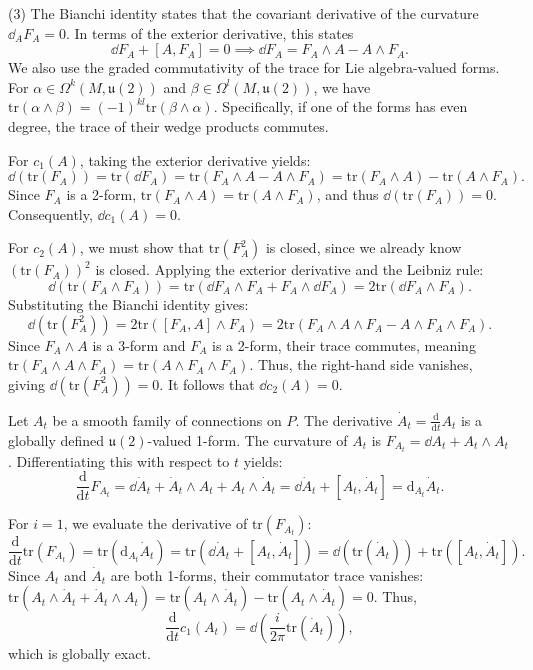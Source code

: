 \documentclass[11pt, letterpaper]{article}
\theoremstyle{plain}
\begin{document}
(3) The Bianchi identity states that the covariant derivative of the curvature $\dd _AF_A=0$. In terms of the exterior derivative, this states
\[
	\dd F_A + [A,F_A] = 0 \implies \dd F_A = F_A \wedge A - A \wedge F_A
.\]
We also use the graded commutativity of the trace for Lie algebra-valued forms. For $\alpha \in \Omega^k(M, \mathfrak{u}(2))$ and $\beta \in \Omega^l(M, \mathfrak{u}(2))$, we have $\mathrm{tr}(\alpha \wedge \beta) = (-1)^{kl} \mathrm{tr}(\beta \wedge \alpha)$. Specifically, if one of the forms has even degree, the trace of their wedge products commutes.




For $c_1(A)$, taking the exterior derivative yields:
\[
	\dd (\mathrm{tr}(F_A)) = \mathrm{tr}(\dd F_A) = \mathrm{tr}(F_A \wedge A - A \wedge F_A) = \mathrm{tr}(F_A \wedge A) - \mathrm{tr}(A \wedge F_A)
.\]
Since $F_A$ is a 2-form, $\mathrm{tr}(F_A \wedge A) = \mathrm{tr}(A \wedge F_A)$, and thus $\dd (\mathrm{tr}(F_A)) = 0$. Consequently, $\dd c_1(A) = 0$.

For $c_2(A)$, we must show that $\mathrm{tr}(F_A^2)$ is closed, since we already know $(\mathrm{tr}(F_A))^2$ is closed. Applying the exterior derivative and the Leibniz rule:
\[
	\dd (\mathrm{tr}(F_A \wedge F_A)) = \mathrm{tr}(\dd F_A \wedge F_A + F_A \wedge \dd F_A) = 2\mathrm{tr}(\dd F_A \wedge F_A)
.\]
Substituting the Bianchi identity gives:
\[
	\dd (\mathrm{tr}(F_A^2)) = 2\mathrm{tr}([F_A, A] \wedge F_A) = 2\mathrm{tr}(F_A \wedge A \wedge F_A - A \wedge F_A \wedge F_A)
.\]
Since $F_A \wedge A$ is a 3-form and $F_A$ is a 2-form, their trace commutes, meaning $\mathrm{tr}(F_A \wedge A \wedge F_A) = \mathrm{tr}(A \wedge F_A \wedge F_A)$. Thus, the right-hand side vanishes, giving $\dd (\mathrm{tr}(F_A^2)) = 0$. It follows that $\dd c_2(A) = 0$.




Let $A_t$ be a smooth family of connections on $P$. The derivative $\dot{A}_t = \frac{\mathrm{d}}{\mathrm{d}t} A_t$ is a globally defined $\mathfrak{u}(2)$-valued 1-form. The curvature of $A_t$ is $F_{A_t} = \dd A_t + A_t \wedge A_t$. Differentiating this with respect to $t$ yields:
\[
	\frac{\mathrm{d}}{\mathrm{d}t} F_{A_t} = \dd \dot{A}_t + \dot{A}_t \wedge A_t + A_t \wedge \dot{A}_t = \dd \dot{A}_t + [A_t, \dot{A}_t] = \mathrm{d}_{A_t} \dot{A}_t
.\]

For $i=1$, we evaluate the derivative of $\mathrm{tr}(F_{A_t})$:
\[
	\frac{\mathrm{d}}{\mathrm{d}t} \mathrm{tr}(F_{A_t}) = \mathrm{tr}(\mathrm{d}_{A_t} \dot{A}_t) = \mathrm{tr}(\dd \dot{A}_t + [A_t, \dot{A}_t]) = \dd (\mathrm{tr}(\dot{A}_t)) + \mathrm{tr}([A_t, \dot{A}_t])
.\]
Since $A_t$ and $\dot{A}_t$ are both 1-forms, their commutator trace vanishes: $\mathrm{tr}(A_t \wedge \dot{A}_t + \dot{A}_t \wedge A_t) = \mathrm{tr}(A_t \wedge \dot{A}_t) - \mathrm{tr}(A_t \wedge \dot{A}_t) = 0$. Thus,
\[
	\frac{\mathrm{d}}{\mathrm{d}t} c_1(A_t) = \dd \left( \frac{i}{2\pi} \mathrm{tr}(\dot{A}_t) \right)
,\]
which is globally exact.
\end{document}
